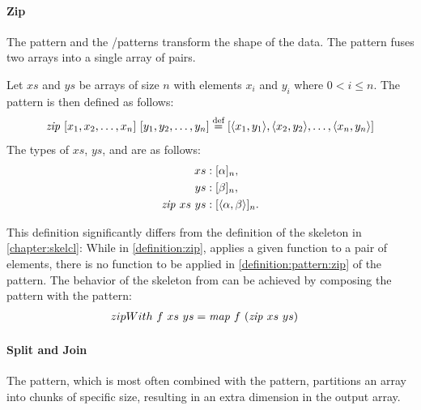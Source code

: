 \paragraph{Zip}
The \zip pattern and the \splitN/\join patterns transform the shape of the data. %
The \zip pattern fuses two arrays into a single array of pairs.

\begin{definition}
  \label{definition:pattern:zip}
  Let $xs$ and $ys$ be arrays of size $n$ with elements $x_i$ and $y_i$ where $0 < i \leq n$.
  The \zip pattern is then defined as follows:
  \begin{equation*}
    \text{\textit{zip}}\ [x_1, x_2, \dots, x_n]\ [y_1, y_2, \dots, y_n]\\
      \stackrel{\textrm{\scriptsize def}}{=} [\langle x_1, y_1\rangle, \langle x_2, y_2\rangle, \dots, \langle x_n, y_n\rangle]
  \end{equation*}
  The types of $xs$, $ys$, and \zip are as follows:
  \begin{align*}
    xs &: [\alpha]_n,\\
    ys &: [\beta]_n,\\
    \text{\textit{zip}}\ xs\ ys &: [\langle\alpha, \beta\rangle]_n .
  \end{align*}
\end{definition}

\noindent
This definition significantly differs from the definition of the \zip skeleton in \autoref{chapter:skelcl}:
While in \autoref{definition:zip}, \zip applies a given function to a pair of elements, there is no function to be applied in \autoref{definition:pattern:zip} of the \zip pattern.
The behavior of the \zip skeleton from \SkelCL can be achieved by composing the \zip pattern with the \map pattern:
\begin{align*}
  zipWith\ f\ xs\ ys &= \text{\textit{map}}\ f\ (\text{\textit{zip}}\ xs\ ys)
\end{align*}


\paragraph{Split and Join}
The \splitN pattern, which is most often combined with the \join pattern, partitions an array into chunks of specific size, resulting in an extra dimension in the output array.


